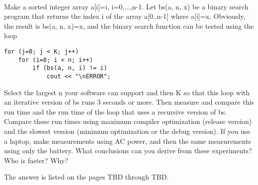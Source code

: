 \documentclass{article}
\begin{document}
	\rmfamily\
	
		Make a sorted integer array a[i]=i, i=0,...,n-1.  Let bs(a, n, x) be a binary search program that returns the index i of the array a[0..n-1] where a[i]=x. Obviously, the result is bs(a, n, x)=x, and the binary search function can be tested using the loop
		
		\begin{verbatim}
for (j=0; j < K; j++)
    for (i=0; i < n; i++)
        if (bs(a, n, i) != i)
            cout << "\nERROR";
		\end{verbatim}
		
		
		Select the largest n your software can support and then K so that this loop with an iterative version of bs runs 3 seconds or more. Then measure and compare this run time and the run time of the loop that uses a recursive version of bs. Compare these run times using maximum compiler optimization (release version) and the slowest version (minimum optimization or the debug version). If you use a laptop, make measurements using AC power, and then the same measurements using only the battery. What conclusions can you derive from these experiments? Who is faster? Why?
		\newline
		
		The answer is listed on the pages TBD through TBD.
	
	
	
\paragraph{}\
\paragraph{}\
\paragraph{}\
\paragraph{}\
\paragraph{}\
\paragraph{}\
\paragraph{}\
\end{document}
